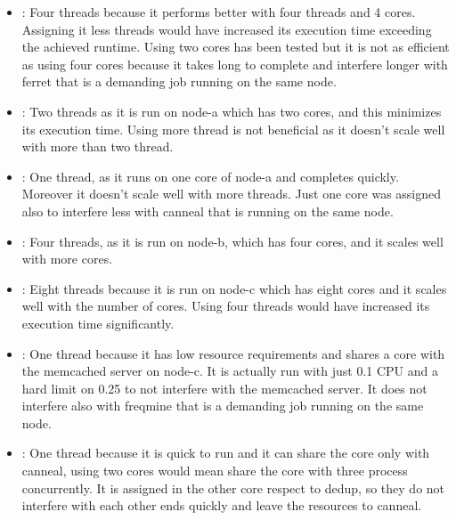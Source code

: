 \begin{enumerate}
\begin{itemize}
        \begin{itemize}
            \item {}: %
            Four threads because it performs better with four threads and 4 cores. Assigning it less threads would have increased its execution time exceeding the achieved runtime. Using two cores has been tested but it is not as efficient as using four cores because it takes long to complete and interfere longer with ferret that is a demanding job running on the same node.

            \item {}: %
            Two threads as it is run on node-a which has two cores, and this minimizes its execution time. Using more thread is not beneficial as it doesn't scale well with more than two thread.

            \item {}: %
            One thread, as it runs on one core of node-a and completes quickly. Moreover it doesn't scale well with more threads. Just one core was assigned also to interfere less with canneal that is running on the same node.

            \item {}: %
            Four threads, as it is run on node-b, which has four cores, and it scales well with more cores.

            \item {}: %
            Eight threads because it is run on node-c which has eight cores and it scales well with the number of cores. Using four threads would have increased its execution time significantly.

            \item {}: %
            One thread because it has low resource requirements and shares a core with the memcached server on node-c. It is actually run with just 0.1 CPU and a hard limit on 0.25 to not interfere with the memcached server. It does not interfere also with freqmine that is a demanding job running on the same node.

            \item {}: %
            One thread because it is quick to run and it can share the core only with canneal, using two cores would mean share the core with three process concurrently. It is assigned in the other core respect to dedup, so they do not interfere with each other ends quickly and leave the resources to canneal.
        \end{itemize}




\end{itemize}
\end{enumerate}
